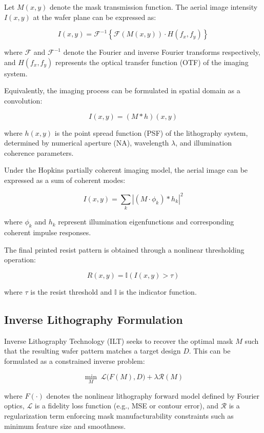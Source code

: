 \documentclass[conference]{IEEEtran}
\begin{document}
Let \( M(x,y) \) denote the mask transmission function. The aerial image intensity \( I(x,y) \) at the wafer plane can be expressed as:

\[
I(x,y) = \mathcal{F}^{-1} \left\{ \mathcal{F}(M(x,y)) \cdot H(f_x,f_y) \right\}
\]

where \( \mathcal{F} \) and \( \mathcal{F}^{-1} \) denote the Fourier and inverse Fourier transforms respectively, and \( H(f_x,f_y) \) represents the optical transfer function (OTF) of the imaging system.

Equivalently, the imaging process can be formulated in spatial domain as a convolution:

\[
I(x,y) = (M * h)(x,y)
\]

where \( h(x,y) \) is the point spread function (PSF) of the lithography system, determined by numerical aperture (NA), wavelength \( \lambda \), and illumination coherence parameters.

Under the Hopkins partially coherent imaging model, the aerial image can be expressed as a sum of coherent modes:

\[
I(x,y) = \sum_{k} \left| (M \cdot \phi_k) * h_k \right|^2
\]

where \( \phi_k \) and \( h_k \) represent illumination eigenfunctions and corresponding coherent impulse responses.

The final printed resist pattern is obtained through a nonlinear thresholding operation:

\[
R(x,y) = \mathbb{I}(I(x,y) > \tau)
\]

where \( \tau \) is the resist threshold and \( \mathbb{I} \) is the indicator function.





\subsection{\textbf{Inverse Lithography Formulation}}

Inverse Lithography Technology (ILT) seeks to recover the optimal mask \( M \) such that the resulting wafer pattern matches a target design \( D \). This can be formulated as a constrained inverse problem:

\[
\min_{M} \; \mathcal{L}\big(F(M), D\big) + \lambda \mathcal{R}(M)
\]

where \( F(\cdot) \) denotes the nonlinear lithography forward model defined by Fourier optics, \( \mathcal{L} \) is a fidelity loss function (e.g., MSE or contour error), and \( \mathcal{R} \) is a regularization term enforcing mask manufacturability constraints such as minimum feature size and smoothness.
\end{document}

